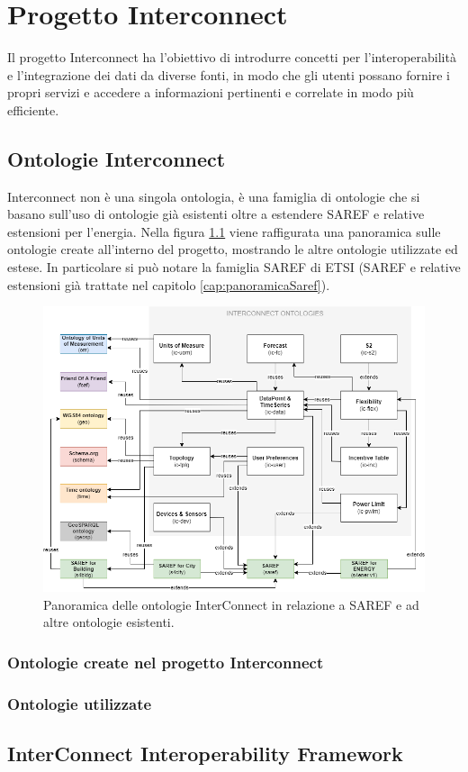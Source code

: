 \chapter{Progetto Interconnect}

Il progetto Interconnect ha l'obiettivo di introdurre concetti per l'interoperabilità e l'integrazione dei dati da diverse fonti, in modo che gli utenti possano fornire i propri servizi e accedere a informazioni pertinenti e correlate in modo più efficiente.


\section{Ontologie Interconnect}
Interconnect non è una singola ontologia, è una famiglia di ontologie che si basano sull'uso di ontologie già esistenti oltre a estendere SAREF e relative estensioni per l'energia.
Nella figura \ref{fig:panoramicaInterconnect} viene raffigurata una panoramica sulle ontologie create all'interno del progetto, mostrando le altre ontologie utilizzate ed estese. In particolare si può notare la famiglia SAREF di ETSI (SAREF e relative estensioni già trattate nel capitolo \ref{cap:panoramicaSaref}).
\begin{figure}[!ht]
    \centering
    \includegraphics[width=\textwidth]{figures/panoramicaInterconnect.png}
    \caption{Panoramica delle ontologie InterConnect in relazione a SAREF e ad altre ontologie esistenti.}
    \label{fig:panoramicaInterconnect}
\end{figure}

\subsection{Ontologie create nel progetto Interconnect}

\subsection{Ontologie utilizzate}

\section{InterConnect Interoperability Framework}